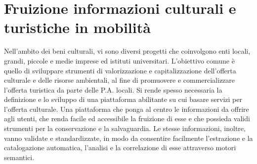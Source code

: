 \section{Fruizione informazioni culturali e turistiche in mobilità}
Nell'ambito dei beni culturali, vi sono diversi progetti che coinvolgono enti locali, grandi, piccole e medie imprese ed istituti universitari.
L'obiettivo comune è quello di sviluppare strumenti di valorizzazione e capitalizzazione dell'offerta culturale e delle risorse ambientali, al fine di promuovere e commercializzare l'offerta turistica da parte delle P.A. locali.
Si rende spesso necessaria la definizione e lo sviluppo di una piattaforma abilitante su cui basare servizi per l'offerta culturale. Una piattaforma che ponga al centro le informazioni da offrire agli utenti, che renda facile ed accessibile la fruizione di esse e che possieda validi strumenti per la conservazione e la salvaguardia.
Le stesse informazioni, inoltre, vanno validate e standardizzate, in modo da consentire facilmente l'estrazione e la catalogazione automatica, l'analisi e la correlazione di esse attraverso motori semantici.

